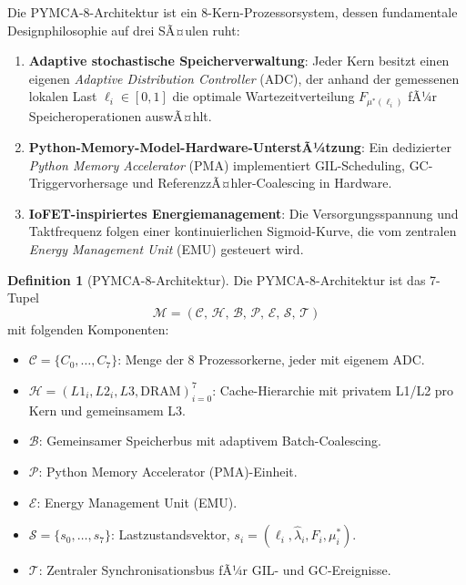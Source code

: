 ﻿\documentclass[a4paper,12pt]{scrreprt}
\theoremstyle{definition}
\newtheorem{definition}{Definition}[section]
\begin{document}
	Die PYMCA-8-Architektur ist ein 8-Kern-Prozessorsystem, dessen
	fundamentale Designphilosophie auf drei SÃ¤ulen ruht:
	
	\begin{enumerate}[noitemsep]
		\item \textbf{Adaptive stochastische Speicherverwaltung}: Jeder Kern besitzt
		einen eigenen \emph{Adaptive Distribution Controller} (ADC), der
		anhand der gemessenen lokalen Last $\ell_i \in [0,1]$ die optimale
		Wartezeitverteilung $F_{\mu^*(\ell_i)}$ fÃ¼r Speicheroperationen
		auswÃ¤hlt.
		\item \textbf{Python-Memory-Model-Hardware-UnterstÃ¼tzung}: Ein dedizierter
		\emph{Python Memory Accelerator} (PMA) implementiert GIL-Scheduling,
		GC-Triggervorhersage und ReferenzzÃ¤hler-Coalescing in Hardware.
		\item \textbf{IoFET-inspiriertes Energiemanagement}: Die Versorgungsspannung
		und Taktfrequenz folgen einer kontinuierlichen Sigmoid-Kurve, die
		vom zentralen \emph{Energy Management Unit} (EMU) gesteuert wird.
	\end{enumerate}
	
	\begin{definition}[PYMCA-8-Architektur]
		\label{def:pymca8}
		Die PYMCA-8-Architektur ist das 7-Tupel
		\[
		\mathcal{M} = \left(\mathcal{C},\, \mathcal{H},\, \mathcal{B},\,
		\mathcal{P},\, \mathcal{E},\, \mathcal{S},\,
		\mathcal{T}\right)
		\]
		mit folgenden Komponenten:
		\begin{itemize}[noitemsep]
			\item $\mathcal{C} = \{C_0, \ldots, C_7\}$: Menge der 8 Prozessorkerne,
			jeder mit eigenem ADC.
			\item $\mathcal{H} = (L1_i, L2_i, L3, \mathrm{DRAM})_{i=0}^{7}$:
			Cache-Hierarchie mit privatem L1/L2 pro Kern und gemeinsamem L3.
			\item $\mathcal{B}$: Gemeinsamer Speicherbus mit adaptivem
			Batch-Coalescing.
			\item $\mathcal{P}$: Python Memory Accelerator (PMA)-Einheit.
			\item $\mathcal{E}$: Energy Management Unit (EMU).
			\item $\mathcal{S} = \{s_0, \ldots, s_7\}$: Lastzustandsvektor,
			$s_i = (\ell_i, \hat\lambda_i, F_i, \mu_i^*)$.
			\item $\mathcal{T}$: Zentraler Synchronisationsbus fÃ¼r GIL- und
			GC-Ereignisse.
		\end{itemize}
	\end{definition}
	
\end{document}
